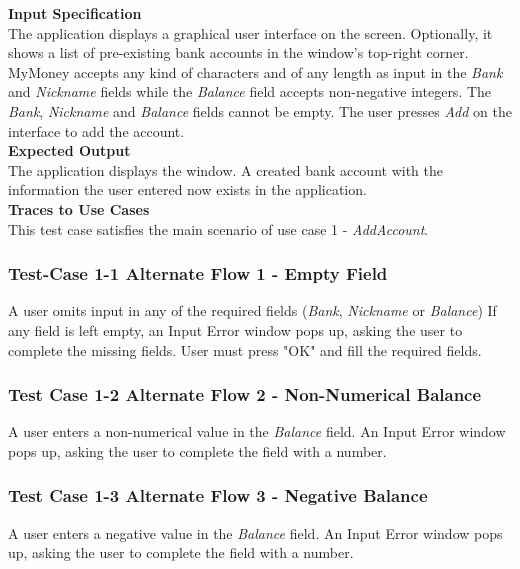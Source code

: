 \documentclass[12pt]{article}
\begin{document}
\noindent
    {\bf Input Specification}\\
    The application displays a graphical user interface on the screen.
    Optionally, it shows a list of pre-existing bank accounts in the window's top-right corner.
    MyMoney accepts any kind of characters and of any length as input in the \textit{Bank} and \textit{Nickname} fields while
    the \textit{Balance} field accepts non-negative integers. The \textit{Bank}, \textit{Nickname} and \textit{Balance} fields cannot be empty.
    The user presses \textit{Add} on the interface to add the account.\\
    
\noindent
    {\bf Expected Output}\\
    The application displays the window.
    A created bank account with the information the user entered now exists in the application.\\
    
\noindent
    {\bf Traces to Use Cases}\\
    This test case satisfies the main scenario of use case 1 - \textit{AddAccount}.\\
    

\subsubsection
{Test-Case 1-1 Alternate Flow 1 - Empty Field}
\noindent 
A user omits input in any of the required fields (\textit{Bank}, \textit{Nickname} or \textit{Balance})  
If any field is left empty, an Input Error window pops up, asking the user to complete the missing fields. User must press "OK" and fill the required fields.

\subsubsection
{Test Case 1-2 Alternate Flow 2 - Non-Numerical Balance}
\noindent 
A user enters a non-numerical value in the \textit{Balance} field. 
An Input Error window pops up, asking the user to complete the field with a number. 

\subsubsection
{Test Case 1-3 Alternate Flow 3 - Negative Balance}
\noindent
A user enters a negative value in the \textit{Balance} field. 
An Input Error window pops up, asking the user to complete the field with a number. 
\end{document}
